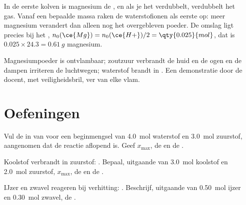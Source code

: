 \begin{remark}\label{rem:g10:reaction-progress-table:plateau}
In de eerste kolven is magnesium de , en als je het
verdubbelt, verdubbelt het gas. Vanaf een bepaalde massa raken de
waterstofionen als eerste op: meer magnesium verandert dan alleen nog
het overgebleven poeder. De omslag ligt precies bij het
,
$n_0(\ce{Mg}) = n_0(\ce{H+})/2 = \qty{0.025}{mol}$, dat is
$0.025 \times 24.3 = \qty{0.61}{g}$ magnesium.
\end{remark}

\begin{safety}{}
Magnesiumpoeder is ontvlambaar; zoutzuur verbrandt de huid en de ogen en
de dampen irriteren de luchtwegen; waterstof brandt in . Een
demonstratie door de docent, met veiligheidsbril, ver van elke vlam.
\end{safety}

\section{Oefeningen}

\begin{exercise}[$\star$]\label{exo:g10:reaction-progress-table:1}
Vul de  in van  voor een
beginmengsel van \qty{4.0}{mol} waterstof en \qty{3.0}{mol} zuurstof,
aangenomen dat de reactie aflopend is. Geef $x_{\max}$, de  en de .
\end{exercise}

\begin{exercise}[$\star$]\label{exo:g10:reaction-progress-table:2}
Koolstof verbrandt in zuurstof: . Bepaal, uitgaande van
\qty{3.0}{mol} koolstof en \qty{2.0}{mol} zuurstof, $x_{\max}$, de
 en de .
\end{exercise}

\begin{exercise}[$\star$]\label{exo:g10:reaction-progress-table:3}
IJzer en zwavel reageren bij verhitting: . Beschrijf,
uitgaande van \qty{0.50}{mol} ijzer en \qty{0.30}{mol} zwavel, de
.
\end{exercise}

